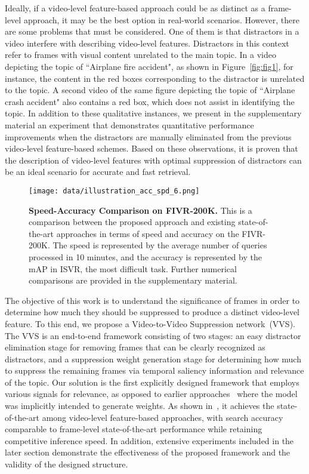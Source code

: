 \documentclass[10pt,twocolumn,letterpaper]{article}
\begin{document}
    Ideally, if a video-level feature-based approach could be as distinct as a frame-level approach, it may be the best option in real-world scenarios. However, there are some problems that must be considered. One of them is that distractors in a video interfere with describing video-level features. Distractors in this context refer to frames with visual content unrelated to the main topic. In a video depicting the topic of ``Airplane fire accident", as shown in Figure~\ref{fig:fig1}, for instance, the content in the red boxes corresponding to the distractor is unrelated to the topic. A second video of the same figure depicting the topic of ``Airplane crash accident" also contains a red box, which does not assist in identifying the topic. In addition to these qualitative instances, we present in the supplementary material an experiment that demonstrates quantitative performance improvements when the distractors are manually eliminated from the previous video-level feature-based schemes. Based on these observations, it is proven that the description of video-level features with optimal suppression of distractors can be an ideal scenario for accurate and fast retrieval.

    \begin{figure}[t!]
        \centering
        \texttt{[image: data/illustration\_acc\_spd\_6.png]}
        \vspace{-3mm}
        \caption{\textbf{Speed-Accuracy Comparison on FIVR-200K.} This is a comparison between the proposed approach and existing state-of-the-art approaches in terms of speed and accuracy on the FIVR-200K. The speed is represented by the average number of queries processed in 10 minutes, and the accuracy is represented by the mAP in ISVR, the most difficult task. Further numerical comparisons are provided in the supplementary material.\vspace{-3mm}} \label{fig:spd_acc}
    \end{figure}

    The objective of this work is to understand the significance of frames in order to determine how much they should be suppressed to produce a distinct video-level feature. To this end, we propose a Video-to-Video Suppression network~(VVS). The VVS is an end-to-end framework consisting of two stages: an easy distractor elimination stage for removing frames that can be clearly recognized as distractors, and a suppression weight generation stage for determining how much to suppress the remaining frames via temporal saliency information and relevance of the topic. Our solution is the first explicitly designed framework that employs various signals for relevance, as opposed to earlier approaches~\cite{kordopatis2017near, shao2021temporal, ng2022vrag} where the model was implicitly intended to generate weights. As shown in~, it achieves the state-of-the-art among video-level feature-based approaches, with search accuracy comparable to frame-level state-of-the-art performance while retaining competitive inference speed. In addition, extensive experiments included in the later section demonstrate the effectiveness of the proposed framework and the validity of the designed structure.
    
\end{document}
